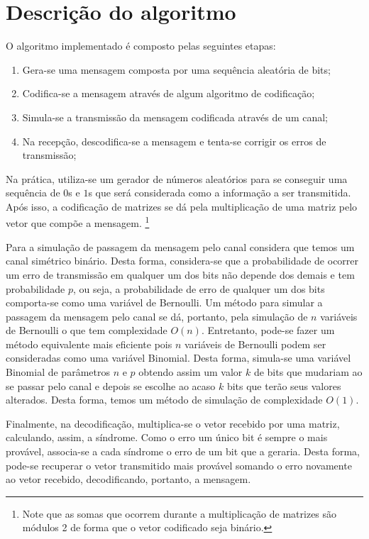 \documentclass[journal,comsoc]{IEEEtran}
\begin{document}
	\section{Descrição do algoritmo}
		
		O algoritmo implementado é composto pelas seguintes etapas:
		\begin{enumerate}
			\item Gera-se uma mensagem composta por uma sequência aleatória de bits;
			\item Codifica-se a mensagem através de algum algoritmo de codificação;
			\item Simula-se a transmissão da mensagem codificada através de um canal;
			\item Na recepção, descodifica-se a mensagem e tenta-se corrigir os erros de transmissão; 
		\end{enumerate}
	
		Na prática, utiliza-se um gerador de números aleatórios para se conseguir uma sequência de $0$s e $1$s que será considerada como a informação a ser transmitida. Após isso, a codificação de matrizes se dá pela multiplicação de uma matriz pelo vetor que compõe a mensagem. \footnote{Note que as somas que ocorrem durante a multiplicação de matrizes são módulos 2 de forma que o vetor codificado seja binário.}
		
		Para a simulação de passagem da mensagem pelo canal considera que temos um canal simétrico binário. Desta forma, considera-se que a probabilidade de ocorrer um erro de transmissão em qualquer um dos bits não depende dos demais e tem probabilidade $p$, ou seja, a probabilidade de erro de qualquer um dos bits comporta-se como uma variável de Bernoulli. Um método para simular a passagem da mensagem pelo canal se dá, portanto, pela simulação de $n$ variáveis de Bernoulli o que tem complexidade $O(n)$. Entretanto, pode-se fazer um método equivalente mais eficiente pois $n$ variáveis de Bernoulli podem ser consideradas como uma variável Binomial. Desta forma, simula-se uma variável Binomial de parâmetros $n$ e $p$ obtendo assim um valor $k$ de bits que mudariam ao se passar pelo canal e depois se escolhe ao acaso $k$ bits que terão seus valores alterados. Desta forma, temos um método de simulação de complexidade $O(1)$.
		
		Finalmente, na decodificação, multiplica-se o vetor recebido por uma matriz, calculando, assim, a síndrome. Como o erro um único bit é sempre o mais provável, associa-se a cada síndrome o erro de um bit que a geraria. Desta forma, pode-se recuperar o vetor transmitido mais provável somando o erro novamente ao vetor recebido, decodificando, portanto, a mensagem.
	
\end{document}
